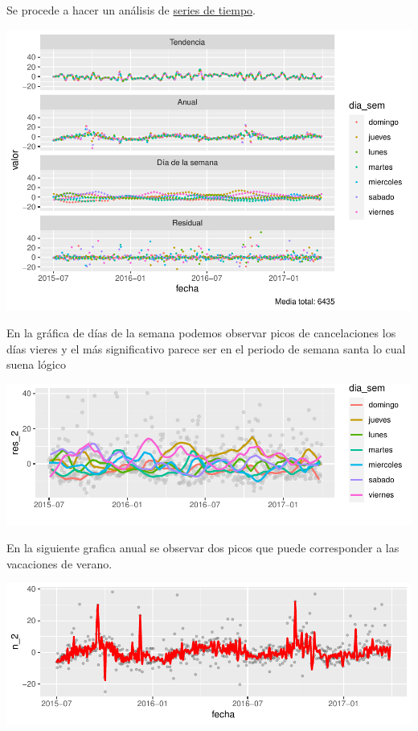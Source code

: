 \documentclass[
]{article}
\begin{document}
Se procede a hacer un análisis de
\href{https://es.wikipedia.org/wiki/Serie_temporal}{series de tiempo}.

\begin{center}\includegraphics{report_files/figure-latex/unnamed-chunk-12-1} \end{center}

En la gráfica de días de la semana podemos observar picos de
cancelaciones los días vieres y el más significativo parece ser en el
periodo de semana santa lo cual suena lógico

\begin{center}\includegraphics[width=0.9\linewidth]{report_files/figure-latex/unnamed-chunk-13-1} \end{center}

En la siguiente grafica anual se observar dos picos que puede
corresponder a las vacaciones de verano.

\begin{center}\includegraphics[width=0.9\linewidth]{report_files/figure-latex/unnamed-chunk-14-1} \end{center}
\end{document}
